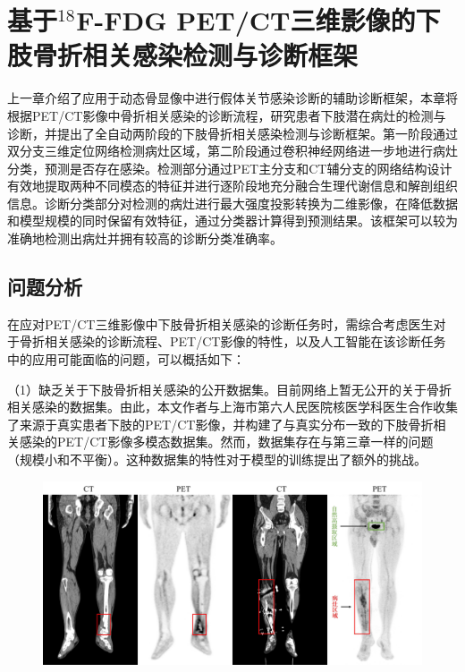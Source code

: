 \chapter{基于\texorpdfstring{\(^{18}\)}{{}}{\tm F-FDG PET/CT}三维影像的下肢骨折相关感染检测与诊断框架}

上一章介绍了应用于动态骨显像中进行假体关节感染诊断的辅助诊断框架，本章将根据PET/CT影像中骨折相关感染的诊断流程，研究患者下肢潜在病灶的检测与诊断，并提出了全自动两阶段的下肢骨折相关感染检测与诊断框架。第一阶段通过双分支三维定位网络检测病灶区域，第二阶段通过卷积神经网络进一步地进行病灶分类，预测是否存在感染。检测部分通过PET主分支和CT辅分支的网络结构设计有效地提取两种不同模态的特征并进行逐阶段地充分融合生理代谢信息和解剖组织信息。诊断分类部分对检测的病灶进行最大强度投影转换为二维影像，在降低数据和模型规模的同时保留有效特征，通过分类器计算得到预测结果。该框架可以较为准确地检测出病灶并拥有较高的诊断分类准确率。

\section{问题分析}

在应对PET/CT三维影像中下肢骨折相关感染的诊断任务时，需综合考虑医生对于骨折相关感染的诊断流程、PET/CT影像的特性，以及人工智能在该诊断任务中的应用可能面临的问题，可以概括如下：

（1）缺乏关于下肢骨折相关感染的公开数据集。目前网络上暂无公开的关于骨折相关感染的数据集。由此，本文作者与上海市第六人民医院核医学科医生合作收集了来源于真实患者下肢的PET/CT影像，并构建了与真实分布一致的下肢骨折相关感染的PET/CT影像多模态数据集。然而，数据集存在与第三章一样的问题（规模小和不平衡）。这种数据集的特性对于模型的训练提出了额外的挑战。

\begin{figure}[htbp]
  \centering
  \includegraphics[width=\textwidth]{figures/chap04_petct.jpg}
  \label{fig:chap04_petct}
\end{figure}

